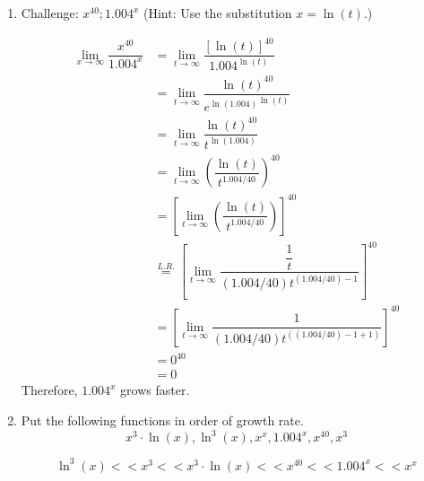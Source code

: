 \documentclass{ximera}
\begin{document}
\begin{problem}
\begin{enumerate}
\begin{explanation}
	$\displaystyle \lim_{x \to \infty}\dfrac{x}{\ln (x)\sqrt{x}}=\displaystyle \lim_{x \to \infty}\dfrac{x^{1/2}}{\ln(x)}$\\
	By L'Hopital's Rule:$\displaystyle \lim_{x \to \infty}\dfrac{(1/2)x^{-1/2}}{x^{-1}}=\displaystyle \lim_{x \to \infty}{(1/2)x^{1/2}}=\infty$\\
		Therefore, $x$ grows faster
		\end{explanation}
		
		\item Challenge: $x^{40}; 1.004^x$ (Hint: Use the substitution $x=\ln(t)$.)
			\begin{explanation}
			\begin{align*}
			\displaystyle \lim_{x \to \infty}\dfrac{x^{40}}{1.004^x} &=\displaystyle \lim_{t \to \infty}\dfrac{[\ln(t)]^{40}}{1.004^{\ln(t)}}\\
			&=\displaystyle \lim_{t \to \infty}\dfrac{\ln(t)^{40}}{{e^{\ln(1.004)}}^{\ln(t)}}\\
			&=\displaystyle \lim_{t \to \infty}\dfrac{\ln(t)^{40}}{t^{\ln(1.004)}}\\
			&=\displaystyle \lim_{t \to \infty}\left(\dfrac{\ln(t)}{t^{1.004/40}}\right)^{40}\\
			&=\left[\displaystyle \lim_{t \to \infty}\left(\dfrac{\ln(t)}{t^{1.004/40}}\right)\right]^{40}\\
			&\stackrel{L.R.}{=} \left[\displaystyle \lim_{t \to \infty}\dfrac{\dfrac{1}{t}}{(1.004/40)t^{(1.004/40)-1}}\right]^{40}\\
			&=\left[\displaystyle \lim_{t \to \infty}\dfrac{1}{(1.004/40)t^{((1.004/40)-1+1)}}\right]^{40}\\
			&=0^{40}\\
			&=0	
				\end{align*}
		Therefore, $1.004^x$ grows faster.
		\end{explanation}
	\item Put the following functions in order of growth rate.\\
	$$x^3 \cdot \ln(x), \ln^{3} (x), x^x, 1.004^x, x^{40}, x^3$$
	
	\begin{explanation}
	
	$$ \ln^{3} (x)<<x^{3}<<x^3 \cdot \ln(x)<< x^{40}<< 1.004^x <<x^x$$
	
	\end{explanation}
	
\end{enumerate}
\end{problem}
\end{document}
